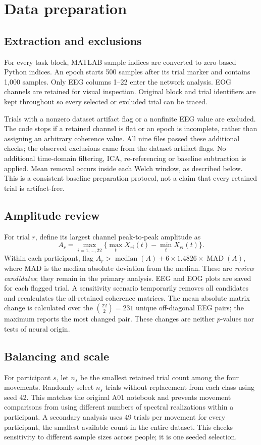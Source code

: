 \documentclass[11pt,a4paper]{article}
\begin{document}
\section{Data preparation}
\subsection{Extraction and exclusions}
For every task block, MATLAB sample indices are converted to zero-based Python indices. An epoch starts 500 samples after its trial marker and contains 1,000 samples. Only EEG columns 1--22 enter the network analysis. EOG channels are retained for visual inspection. Original block and trial identifiers are kept throughout so every selected or excluded trial can be traced.

Trials with a nonzero dataset artifact flag or a nonfinite EEG value are excluded. The code stops if a retained channel is flat or an epoch is incomplete, rather than assigning an arbitrary coherence value. All nine files passed these additional checks; the observed exclusions came from the dataset artifact flags. No additional time-domain filtering, ICA, re-referencing or baseline subtraction is applied. Mean removal occurs inside each Welch window, as described below. This is a consistent baseline preparation protocol, not a claim that every retained trial is artifact-free.

\subsection{Amplitude review}
For trial $r$, define its largest channel peak-to-peak amplitude as
\begin{equation}
 A_r=\max_{i=1,\ldots,22}\{\max_t X_{ri}(t)-\min_t X_{ri}(t)\}.
\end{equation}
Within each participant, flag $A_r>\operatorname{median}(A)+6\times1.4826\times\operatorname{MAD}(A)$, where MAD is the median absolute deviation from the median. These are \emph{review candidates}; they remain in the primary analysis. EEG and EOG plots are saved for each flagged trial. A sensitivity scenario temporarily removes all candidates and recalculates the all-retained coherence matrices. The mean absolute matrix change is calculated over the $\binom{22}{2}=231$ unique off-diagonal EEG pairs; the maximum reports the most changed pair. These changes are neither $p$-values nor tests of neural origin.

\subsection{Balancing and scale}
For participant $s$, let $n_s$ be the smallest retained trial count among the four movements. Randomly select $n_s$ trials without replacement from each class using seed 42. This matches the original A01 notebook and prevents movement comparisons from using different numbers of spectral realizations within a participant. A secondary analysis uses 49 trials per movement for every participant, the smallest available count in the entire dataset. This checks sensitivity to different sample sizes across people; it is one seeded selection.
\end{document}
